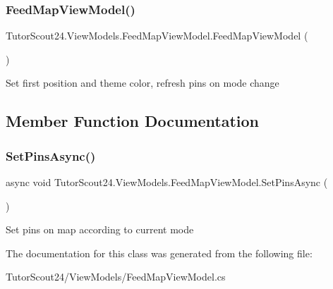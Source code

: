 \subsubsection{\texorpdfstring{Feed\+Map\+View\+Model()}{FeedMapViewModel()}}
{\footnotesize\ttfamily Tutor\+Scout24.\+View\+Models.\+Feed\+Map\+View\+Model.\+Feed\+Map\+View\+Model (\begin{DoxyParamCaption}{ }\end{DoxyParamCaption})\hspace{0.3cm}{\ttfamily [inline]}}



Set first position and theme color, refresh pins on mode change 



\subsection{Member Function Documentation}
\mbox{\label{class_tutor_scout24_1_1_view_models_1_1_feed_map_view_model_a185abcf0335630b2ce5011d70464df58}} 
\subsubsection{\texorpdfstring{Set\+Pins\+Async()}{SetPinsAsync()}}
{\footnotesize\ttfamily async void Tutor\+Scout24.\+View\+Models.\+Feed\+Map\+View\+Model.\+Set\+Pins\+Async (\begin{DoxyParamCaption}{ }\end{DoxyParamCaption})\hspace{0.3cm}{\ttfamily [inline]}}



Set pins on map according to current mode 



The documentation for this class was generated from the following file\+:\begin{DoxyCompactItemize}
\item 
Tutor\+Scout24/\+View\+Models/Feed\+Map\+View\+Model.\+cs\end{DoxyCompactItemize}
